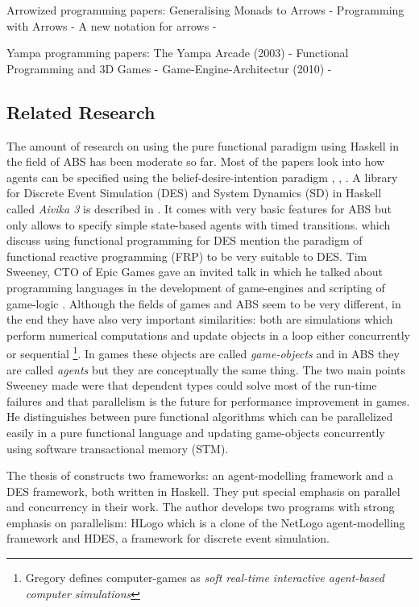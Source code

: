 Arrowized programming papers:
Generalising Monads to Arrows - \cite{hughes_generalising_2000}
Programming with Arrows - \cite{hughes_programming_2005}
A new notation for arrows - \cite{paterson_new_2001}

Yampa programming papers:
The Yampa Arcade (2003) - \cite{courtney_yampa_2003}
Functional Programming and 3D Games - \cite{mun_hon_functional_2005}
Game-Engine-Architectur (2010) - \cite{meisinger_game-engine-architektur_2010}

\subsection{Related Research}
The amount of research on using the pure functional paradigm using Haskell in the field of ABS has been moderate so far. Most of the papers look into how agents can be specified using the belief-desire-intention paradigm \cite{de_jong_suitability_2014}, \cite{sulzmann_specifying_2007}, \cite{jankovic_functional_2007}. A library for Discrete Event Simulation (DES) and System Dynamics (SD) in Haskell called \textit{Aivika 3} is described in \cite{sorokin_aivika_2015}. It comes with very basic features for ABS but only allows to specify simple state-based agents with timed transitions.
\cite{jankovic_functional_2007} which discuss using functional programming for DES mention the paradigm of functional reactive programming (FRP) to be very suitable to DES. 
Tim Sweeney, CTO of Epic Games gave an invited talk in which he talked about programming languages in the development of game-engines and scripting of game-logic \cite{sweeney_next_2006}. Although the fields of games and ABS seem to be very different, in the end they have also very important similarities: both are simulations which perform numerical computations and update objects in a loop either concurrently or sequential \footnote{Gregory \cite{gregory_game_2018} defines computer-games as \textit{soft real-time interactive agent-based computer simulations}}. In games these objects are called \textit{game-objects} and in ABS they are called \textit{agents} but they are conceptually the same thing. The two main points Sweeney made were that dependent types could solve most of the run-time failures and that parallelism is the future for performance improvement in games. He distinguishes between pure functional algorithms which can be parallelized easily in a pure functional language and updating game-objects concurrently using software transactional memory (STM).

The thesis of \cite{bezirgiannis_improving_2013} constructs two frameworks: an agent-modelling framework and a DES framework, both written in Haskell. They put special emphasis on parallel and concurrency in their work. The author develops two programs with strong emphasis on parallelism: HLogo which is a clone of the NetLogo agent-modelling framework and HDES, a framework for discrete event simulation.

